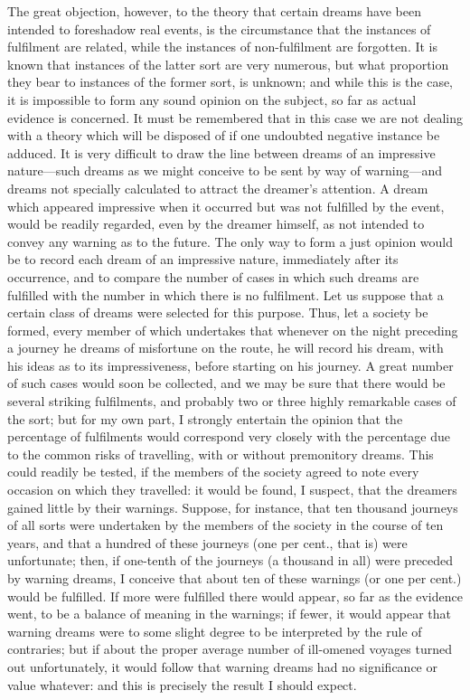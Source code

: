 \documentclass[letterpaper,12pt,oneside,openany]{memoir}
\begin{document}
The great objection, however, to the theory that
certain dreams have been intended to foreshadow real
events, is the circumstance that the instances of fulfilment
are related, while the instances of non-fulfilment
are forgotten. It is known that instances of the latter
sort are very numerous, but what proportion they bear
to instances of the former sort, is unknown; and while
this is the case, it is impossible to form any sound
opinion on the subject, so far as actual evidence is
concerned. It must be remembered that in this case
we are not dealing with a theory which will be disposed
of if one undoubted negative instance be
adduced. It is very difficult to draw the line between
dreams of an impressive nature---such dreams as we
might conceive to be sent by way of warning---and
dreams not specially calculated to attract the dreamer's
attention. A dream which appeared impressive when
it occurred but was not fulfilled by the event, would
be readily regarded, even by the dreamer himself, as
not intended to convey any warning as to the future.
The only way to form a just opinion would be to
record each dream of an impressive nature, immediately
after its occurrence, and to compare the
number of cases in which such dreams are fulfilled
with the number in which there is no fulfilment. Let
us suppose that a certain class of dreams were selected
for this purpose. Thus, let a society be formed, every
member of which undertakes that whenever on the
night preceding a journey he dreams of misfortune on
the route, he will record his dream, with his ideas as
to its impressiveness, before starting on his journey.
A great number of such cases would soon be collected,
and we may be sure that there would be several
striking fulfilments, and probably two or three highly
remarkable cases of the sort; but for my own part, I
strongly entertain the opinion that the percentage of
fulfilments would correspond very closely with the
percentage due to the common risks of travelling, with
or without premonitory dreams. This could readily
be tested, if the members of the society agreed to note
every occasion on which they travelled: it would be
found, I suspect, that the dreamers gained little by
their warnings. Suppose, for instance, that ten thousand
journeys of all sorts were undertaken by the members
of the society in the course of ten years, and that a
hundred of these journeys (one per cent., that is) were
unfortunate; then, if one-tenth of the journeys (a
thousand in all) were preceded by warning dreams, I
conceive that about ten of these warnings (or one per
cent.) would be fulfilled. If more were fulfilled there
would appear, so far as the evidence went, to be a
balance of meaning in the warnings; if fewer, it would
appear that warning dreams were to some slight degree
to be interpreted by the rule of contraries; but if
about the proper average number of ill-omened voyages
turned out unfortunately, it would follow that warning
dreams had no significance or value whatever: and this
is precisely the result I should expect.
\end{document}
